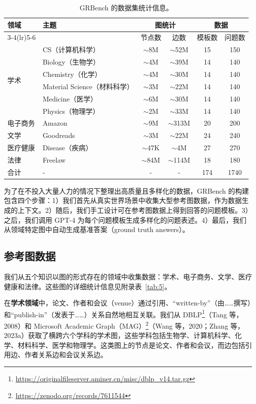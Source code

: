 \documentclass[11pt,UTF8,fontset=fandol]{ctexart}
\begin{document}
\begin{table}[H]\centering
\caption{GRBench 的数据集统计信息。}
\label{tab:1}
\small
\begin{tabular}{llcccc}
\toprule
\multirow{2}{*}{领域} & \multirow{2}{*}{主题} & \multicolumn{2}{c}{图统计} & \multicolumn{2}{c}{数据} \\
\cmidrule(lr){3-4}\cmidrule(lr){5-6}
 &  & 节点数 & 边数 & 模板数 & 问题数 \\
\midrule
\multirow{6}{*}{学术} & CS（计算机科学） & $\sim$8M & $\sim$52M & 15 & 150 \\
 & Biology（生物学） & $\sim$4M & $\sim$39M & 14 & 140 \\
 & Chemistry（化学） & $\sim$4M & $\sim$30M & 14 & 140 \\
 & Material Science（材料科学） & $\sim$3M & $\sim$22M & 14 & 140 \\
 & Medicine（医学） & $\sim$6M & $\sim$30M & 14 & 140 \\
 & Physics（物理学） & $\sim$2M & $\sim$33M & 14 & 140 \\
电子商务 & Amazon & $\sim$9M & $\sim$313M & 20 & 200 \\
文学 & Goodreads & $\sim$3M & $\sim$22M & 24 & 240 \\
医疗健康 & Disease（疾病） & $\sim$47K & $\sim$4M & 27 & 270 \\
法律 & Freelaw & $\sim$84M & $\sim$114M & 18 & 180 \\
\midrule
合计 & - & - & - & 174 & 1740 \\
\bottomrule
\end{tabular}
\end{table}

为了在不投入大量人力的情况下整理出高质量且多样化的数据，GRBench 的构建包含四个步骤：1）我们首先从真实世界场景中收集大型参考图数据，作为数据生成的上下文。2）随后，我们手工设计可在参考图数据上得到回答的问题模板。3）之后，我们调用 GPT-4 为每个问题模板生成多样化的问题表述。4）最后，我们从领域特定图中自动生成基准答案（ground truth answers）。

\subsection{参考图数据}

我们从五个知识以图的形式存在的领域中收集数据：学术、电子商务、文学、医疗健康和法律。这些图的详细统计信息见附录表~\ref{tab:5}。

在\textbf{学术领域}中，论文、作者和会议（venue）通过引用、“written-by”（由……撰写）和“publish-in”（发表于……）关系自然地相互关联。我们从 DBLP\footnote{\url{https://originalfileserver.aminer.cn/misc/dblp_v14.tar.gz}}（Tang 等，2008）和 Microsoft Academic Graph（MAG）\footnote{\url{https://zenodo.org/records/7611544}}（Wang 等，2020；Zhang 等，2023a）获取了横跨六个学科的学术图，这些学科包括生物学、计算机科学、化学、材料科学、医学和物理学。这类图上的节点是论文、作者和会议，而边包括引用边、作者关系边和会议关系边。
\end{document}
